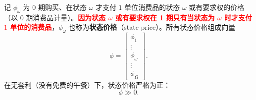 \begin{tcolorbox}[knowledge,title=3.2 状态价格]
记 $\phi_{\omega}$ 为 0 期购买、在状态 $\omega$ 才支付 $1$ 单位消费品的状态 $\omega$ 或有要求权的价格（以 0 期消费品计量）。\textcolor{red}{\textbf{因为状态 $\omega$ 或有要求权在 1 期只有当状态为 $\omega$ 时才支付 $1$ 单位的消费品}}，$\phi_{\omega}$ 也称为\textbf{状态价格}（state price）。所有状态价格组成向量
\[
    \phi=\begin{bmatrix}\phi_1 \\ \vdots \\ \phi_{\omega} \\ \vdots \\ \phi_{\Omega}\end{bmatrix}.
\]
在无套利（没有免费的午餐）下，状态价格严格为正：
\[
    \phi\gg 0.
\]
\end{tcolorbox}

